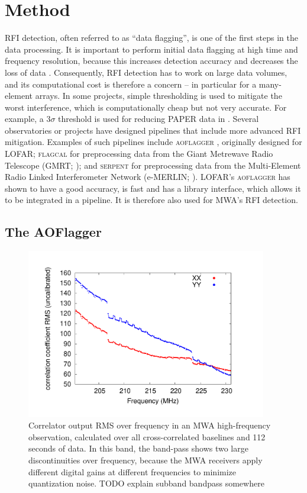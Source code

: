 \documentclass[useAMS,usenatbib]{mn2e}
\begin{document}
\section{Method}
RFI detection, often referred to as ``data flagging'', is one of the first steps in the data processing. It is important to perform initial data flagging at high time and frequency resolution, because this increases detection accuracy and decreases the loss of data \citep{lofar-radio-environment}. Consequently, RFI detection has to work on large data volumes, and its computational cost is therefore a concern -- in particular for a many-element arrays. In some projects, simple thresholding is used to mitigate the worst interference, which is computationally cheap but not very accurate. For example, a $3\sigma$ threshold is used for reducing PAPER data in \citet{parsons-paper-eorlimit-2014}. Several observatories or projects have designed pipelines that include more advanced RFI mitigation. Examples of such pipelines include \textsc{aoflagger} \citep{post-correlation-rfi-classification,scale-invariant-rank-operator}, originally designed for LOFAR; \textsc{flagcal} for preprocessing data from the Giant Metrewave Radio Telescope (GMRT; \citealt{prasad-flagcal-2012}); and \textsc{serpent} for preprocessing data from the Multi-Element Radio Linked Interferometer Network (e-MERLIN; \citealt{serpent-peck-2013}). LOFAR's \textsc{aoflagger} has shown to have a good accuracy, is fast and has a library interface, which allows it to be integrated in a pipeline. It is therefore also used for MWA's RFI detection.

\subsection{The AOFlagger}

\begin{figure}
\begin{center}\hspace*{-0.8cm}\includegraphics[width=10.5cm]{img/bandpass}
\caption{Correlator output RMS over frequency in an MWA high-frequency observation, calculated over all cross-correlated baselines and 112 seconds of data. In this band, the band-pass shows two large discontinuities over frequency, because the MWA receivers apply different digital gains at different frequencies to minimize quantization noise. TODO explain subband bandpass somewhere %
}
\label{fig:bandpass}
\end{center}
\end{figure}
\end{document}
